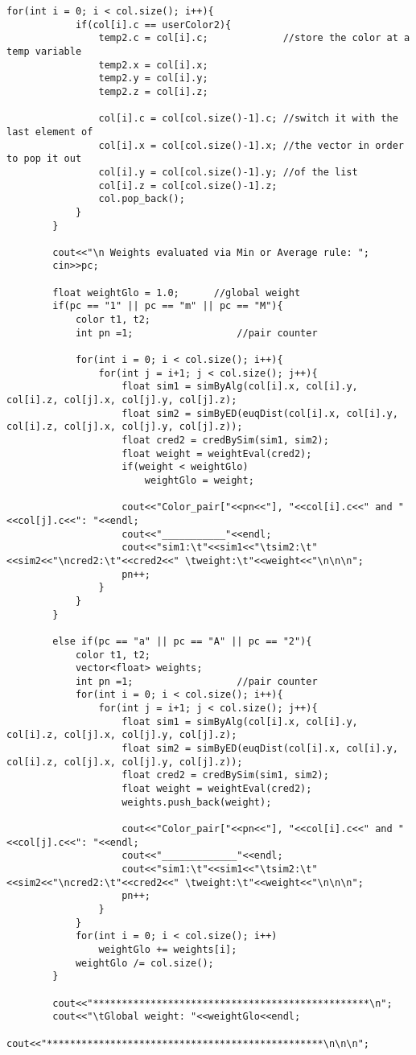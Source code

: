\begin{lstlisting}[caption=The C++ implementation of the application concerning colors, breaklines=true]
		for(int i = 0; i < col.size(); i++){
			if(col[i].c == userColor2){
				temp2.c = col[i].c;				//store the color at a temp variable
				temp2.x = col[i].x;
				temp2.y = col[i].y;
				temp2.z = col[i].z;

				col[i].c = col[col.size()-1].c;	//switch it with the last element of
				col[i].x = col[col.size()-1].x;	//the vector in order to pop it out
				col[i].y = col[col.size()-1].y;	//of the list
				col[i].z = col[col.size()-1].z;
				col.pop_back();
			}
		}

		cout<<"\n Weights evaluated via Min or Average rule: ";
		cin>>pc;

		float weightGlo = 1.0;		//global weight
		if(pc == "1" || pc == "m" || pc == "M"){
			color t1, t2;
			int pn =1;					//pair counter

			for(int i = 0; i < col.size(); i++){
				for(int j = i+1; j < col.size(); j++){
					float sim1 = simByAlg(col[i].x, col[i].y, col[i].z, col[j].x, col[j].y, col[j].z);
					float sim2 = simByED(euqDist(col[i].x, col[i].y, col[i].z, col[j].x, col[j].y, col[j].z));
					float cred2 = credBySim(sim1, sim2);
					float weight = weightEval(cred2);
					if(weight < weightGlo)
						weightGlo = weight;

					cout<<"Color_pair["<<pn<<"], "<<col[i].c<<" and "<<col[j].c<<": "<<endl;
					cout<<"___________"<<endl;
					cout<<"sim1:\t"<<sim1<<"\tsim2:\t"<<sim2<<"\ncred2:\t"<<cred2<<" \tweight:\t"<<weight<<"\n\n\n";
					pn++;
				}
			}
		}

		else if(pc == "a" || pc == "A" || pc == "2"){
			color t1, t2;
			vector<float> weights;
			int pn =1;					//pair counter
			for(int i = 0; i < col.size(); i++){
				for(int j = i+1; j < col.size(); j++){
					float sim1 = simByAlg(col[i].x, col[i].y, col[i].z, col[j].x, col[j].y, col[j].z);
					float sim2 = simByED(euqDist(col[i].x, col[i].y, col[i].z, col[j].x, col[j].y, col[j].z));
					float cred2 = credBySim(sim1, sim2);
					float weight = weightEval(cred2);
					weights.push_back(weight);

					cout<<"Color_pair["<<pn<<"], "<<col[i].c<<" and "<<col[j].c<<": "<<endl;
					cout<<"_____________"<<endl;
					cout<<"sim1:\t"<<sim1<<"\tsim2:\t"<<sim2<<"\ncred2:\t"<<cred2<<" \tweight:\t"<<weight<<"\n\n\n";
					pn++;
				}
			}
			for(int i = 0; i < col.size(); i++)
				weightGlo += weights[i];
			weightGlo /= col.size();
		}

		cout<<"************************************************\n";
		cout<<"\tGlobal weight: "<<weightGlo<<endl;
		cout<<"************************************************\n\n\n";


\end{lstlisting}
